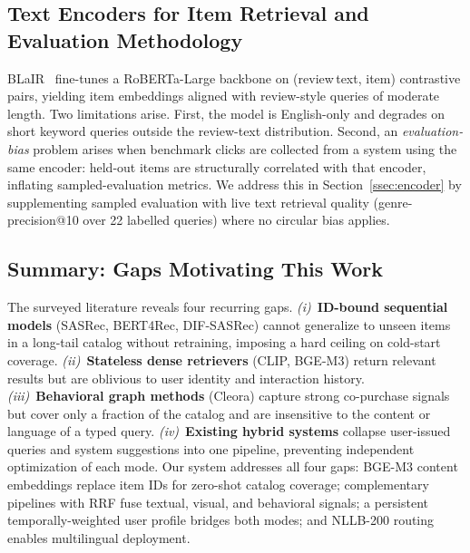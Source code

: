 \subsection{Text Encoders for Item Retrieval and Evaluation Methodology}
BLaIR~\cite{hou2024amazon} fine-tunes a RoBERTa-Large backbone on
(review\,text, item) contrastive pairs, yielding item embeddings aligned
with review-style queries of moderate length.
Two limitations arise.
First, the model is English-only and degrades on short keyword queries outside
the review-text distribution.
Second, an \emph{evaluation-bias} problem arises when benchmark clicks are
collected from a system using the same encoder: held-out items are structurally
correlated with that encoder, inflating sampled-evaluation metrics.
We address this in Section~\ref{ssec:encoder} by supplementing sampled
evaluation with live text retrieval quality (genre-precision@10 over 22
labelled queries) where no circular bias applies.

\subsection{Summary: Gaps Motivating This Work}
The surveyed literature reveals four recurring gaps.
\textit{(i)}~\textbf{ID-bound sequential models} (SASRec, BERT4Rec, DIF-SASRec) cannot
generalize to unseen items in a long-tail catalog without retraining, imposing
a hard ceiling on cold-start coverage.
\textit{(ii)}~\textbf{Stateless dense retrievers} (CLIP, BGE-M3) return relevant results
but are oblivious to user identity and interaction history.
\textit{(iii)}~\textbf{Behavioral graph methods} (Cleora) capture strong co-purchase
signals but cover only a fraction of the catalog and are insensitive to the
content or language of a typed query.
\textit{(iv)}~\textbf{Existing hybrid systems} collapse user-issued queries and
system suggestions into one pipeline, preventing independent optimization
of each mode.
Our system addresses all four gaps: BGE-M3 content embeddings replace item
IDs for zero-shot catalog coverage; complementary pipelines with RRF fuse
textual, visual, and behavioral signals; a persistent temporally-weighted
user profile bridges both modes; and NLLB-200 routing enables multilingual
deployment.
